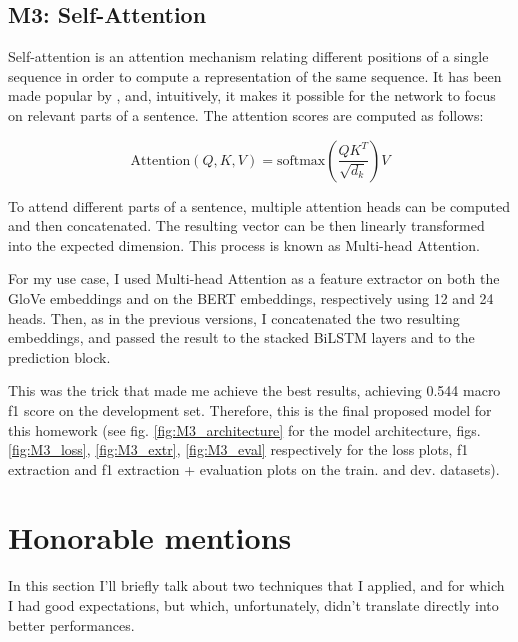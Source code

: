 \documentclass[11pt,a4paper]{article}
\begin{document}
	\subsection{M3: Self-Attention}
	Self-attention is an attention mechanism relating different positions
	of a single sequence in order to compute a representation of the same sequence.
	It has been made popular by \citep{vaswani2017attention}, and, intuitively, it
	makes it possible for the network to focus on relevant parts of a sentence. The
	attention scores are computed as follows:
	
	\begin{equation}
	\mathrm{Attention}(Q, K, V) = \mathrm{softmax}(\frac{QK^T}{\sqrt{d_k}})V
	\end{equation}
	
	To attend different parts of a sentence, multiple attention heads can be
	computed and then concatenated. The resulting vector can be then linearly
	transformed into the expected dimension. This process is known as Multi-head
	Attention.
	
	For my use case, I used Multi-head Attention as a feature extractor on both the
	GloVe embeddings and on the BERT embeddings, respectively using 12 and 24 heads.
	Then, as in the previous versions, I concatenated the two resulting embeddings,
	and passed the result to the stacked BiLSTM layers and to the prediction block.
	
	This was the trick that made me achieve the best results, achieving 0.544 macro
	f1 score on the development set. Therefore, this is the final proposed model for
	this homework (see fig. \ref{fig:M3_architecture} for the model architecture,
	figs. \ref{fig:M3_loss}, \ref{fig:M3_extr}, \ref{fig:M3_eval} respectively for
	the loss plots, f1 extraction and f1 extraction + evaluation plots on the train.
	and dev. datasets).
	
	\section{Honorable mentions}
	In this section I'll briefly talk about two techniques that I applied, and for
	which I had good expectations, but which, unfortunately, didn't translate
	directly into better performances.
	
\end{document}
